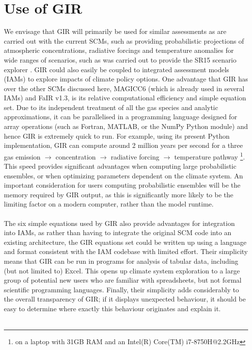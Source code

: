 \documentclass[gmd, manuscript]{copernicus}
\begin{document}
\section{Use of GIR}
We envisage that GIR will primarily be used for similar assessments as are carried out with the current SCMs, such as providing probabilistic projections of atmospheric concentrations, radiative forcings and temperature anomalies for wide ranges of scenarios, such as was carried out to provide the SR15 scenario explorer \citep{Huppmann:2018:scenario-data}. GIR could also easily be coupled to integrated assessment models (IAMs) to explore impacts of climate policy options. One advantage that GIR has over the other SCMs discussed here, MAGICC6 (which is already used in several IAMs) and FaIR v1.3, is its relative computational efficiency and simple equation set. Due to its independent treatment of all the gas species and analytic approximations, it can be parallelised in a programming language designed for array operations (such as Fortran, MATLAB, or the NumPy Python module) and hence GIR is extremely quick to run. For example, using its present Python implementation, GIR can compute around 2 million years per second for a three gas emission $\rightarrow$ concentration $\rightarrow$ radiative forcing $\rightarrow$ temperature pathway \footnote{on a laptop with 31GB RAM and an Intel(R) Core(TM) i7-8750H@2.2GHz}. This speed provides significant advantages when computing large probabilistic ensembles, or when optimizing parameters dependent on the climate system. An important consideration for users computing probabilistic ensembles will be the memory required by GIR output, as this is significantly more likely to be the limiting factor on a modern computer, rather than the model runtime.\\\\
The six simple equations used by GIR also provide advantages for integration into IAMs, as rather than having to integrate the original SCM code into an existing architecture, the GIR equations set could be written up using a language and format consistent with the IAM codebase with limited effort. Their simplicity means that GIR can be run in programs for analysis of tabular data, including (but not limited to) Excel. This opens up climate system exploration to a large group of potential new users who are familiar with spreadsheets, but not formal scientific programming languages. Finally, their simplicity adds considerably to the overall transparency of GIR; if it displays unexpected behaviour, it should be easy to determine where exactly this behaviour originates and explain it.\\\\
\end{document}
